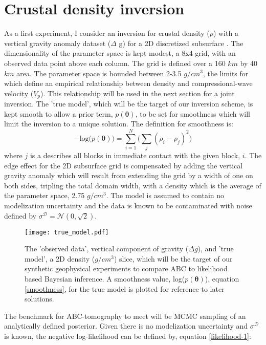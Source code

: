 \section{Crustal density inversion}

As a first experiment, I consider an inversion for crustal density ($\rho$) with a vertical gravity anomaly dataset ($\Delta$ g) for a 2D discretized subsurface \citep[p.184-195,378]{blakely1996}. The dimensionality of the parameter space is kept modest, a 8x4 grid, with an observed data point above each column. The grid is defined over a 160 $km$ by 40 $km$ area. The parameter space is bounded between 2-3.5 $g/cm^3$, the limits for which \citet{Brocher2005} define an empirical relationship between density and compressional-wave velocity ($V_p$). This relationship will be used in the next section for a joint inversion. The 'true model', which will be the target of our inversion scheme, is kept smooth to allow a prior term, $p(\bm{\theta})$, to be set for smoothness which will limit the inversion to a unique solution. The definition for smoothness is:
\begin{equation}
-\text{log}\big(p(\bm{\theta})\big) = \sum_{i = 1}^{N} \Big(\sum_{j} (\rho_i - \rho_j)^2\Big)
\label{smoothness}
\end{equation}
where $j$ is a describes all blocks in immediate contact with the given block, $i$. The edge effect for the 2D subsurface grid is compensated by adding the vertical gravity anomaly which will result from extending the grid by a width of one on both sides, tripling the total domain width, with a density which is the average of the parameter space, 2.75 $g/cm^3$. The model is assumed to contain no modelization uncertainty and the data is known to be contaminated with noise defined by $\sigma^{\mathcal{D}} = \mathcal{N}(0,\sqrt{2})$.
\begin{figure}[H]
	\centering
	\texttt{[image: true\_model.pdf]}
	\caption{The 'observed data', vertical component of gravity ($\Delta g$), and 'true model', a 2D density ($g/cm^3$) slice, which will be the target of our synthetic geophysical experiments to compare ABC to likelihood based Bayesian inference. A smoothness value, log($p(\bm{\theta})$), equation \ref{smoothness}, for the true model is plotted for reference to later solutions.}
	\label{true_model}
\end{figure}
The benchmark for ABC-tomography to meet will be MCMC sampling of an analytically defined posterior. Given there is no modelization uncertainty and $\sigma^{\mathcal{D}}$ is known, the negative log-likelihood can be defined by, equation \ref{likelihood-1}:
